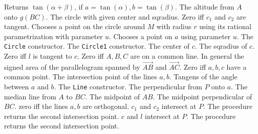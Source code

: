 	{Returns $\tan(\alpha+\beta)$, if $a=\tan(\alpha), b=\tan(\beta)$.}  
	{The altitude from $A$ onto $g(BC)$. } 
	{The circle with given center and sqradius.} 
	{Zero iff $c_1$ and $c_2$ are tangent.} 
	{Chooses a point on the circle around $M$ with radius $r$ using its rational 
	parametrization with parameter  $u$.} 
	{Chooses a point on $a$ using parameter $u$.} 
	{The {\tt Circle} constructor.} 
	{The {\tt Circle1} constructor. } 
	{The center of $c$.} 
	{The sqradius of $c$.} 
	{Zero iff $l$ is tangent to $c$.} 
	{Zero iff $A,B,C$ are on a common line. In general the signed area of the 
	parallelogram spanned by $\vec{AB}$ and $\vec{AC}$. }
	{Zero iff $a,b,c$ have a common point.} 
	{The intersection point of the lines $a,b$. }
	{Tangens of the angle between $a$ and $b$. } 
	{The {\tt Line} constructor.}
	{The perpendicular from $P$ onto $a$.}
	{The median line from $A$ to $BC$.}
	{The midpoint of $AB$. }
	{The midpoint perpendicular of $BC$.}
	{zero iff the lines $a,b$ are orthogonal. }
	{ $c_1$ and $c_2$ intersect at $P$. The procedure returns the second 
	intersection point. }
	{$c$ and $l$ intersect at $P$. The procedure returns the second intersection
	point.}

